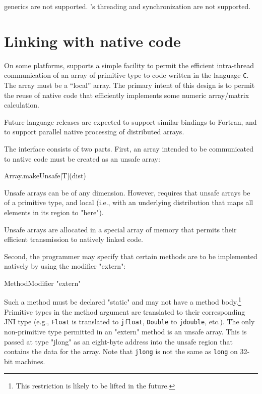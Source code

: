 \java{} generics are not supported.
\java{}'s threading and synchronization are not supported.

\fi

\chapter{Linking with native code}\label{extern}

On some platforms,
\XtenCurrVer{} supports a simple facility to permit the efficient
intra-thread communication of an array of primitive type to code
written in the language {\tt C}.  The array must be a ``local''
array. The primary intent of this design is to permit the reuse of
native code that efficiently implements some numeric array/matrix
calculation.

Future language releases are expected to support similar bindings to
{\sc Fortran}, and to support parallel native processing of
distributed \Xten{} arrays. 

The interface consists of two parts. First, an array intended to be
communicated to native code must be created as an unsafe array:
\begin{xten}
Array.makeUnsafe[T](dist)
\end{xten}
Unsafe arrays can be of any dimension. However, \XtenCurrVer{}
requires that unsafe arrays be of a primitive type, and local
(i.e.,
with an underlying distribution that maps all elements in its region
to \xcd"here").

Unsafe arrays are allocated in a special array of memory that permits
their efficient transmission to natively linked code.

Second, the \Xten{} programmer may specify that certain methods are to
be implemented natively by using the modifier \xcd"extern":

\begin{grammar}
   MethodModifier \: \xcd"extern"
\end{grammar}

Such a method must be declared \xcd"static" and may not have a
method body.\footnote{This
restriction is likely to be lifted in the future.}  Primitive types in
the method argument are translated to their corresponding JNI type
(e.g., {\tt Float} is translated to {\tt jfloat}, {\tt Double} to
{\tt jdouble}, etc.).  The only non-primitive type permitted in an
\xcd"extern" method is an unsafe array. This is passed at type
\xcd"jlong" as an eight-byte address into the unsafe region that contains
the data for the array.  Note that {\tt jlong} is not the same as {\tt long} on
32-bit machines.


